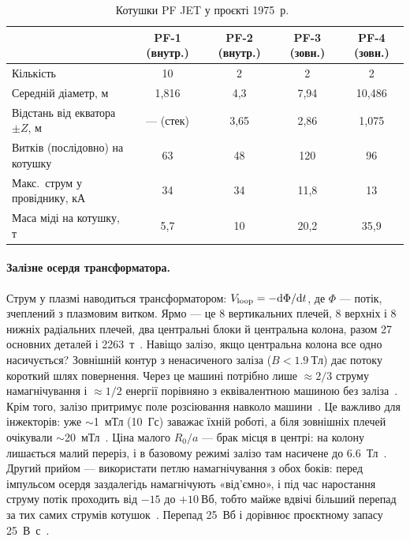 \begin{table}[!tb]\centering\small\setlength{\tabcolsep}{5pt}
\caption{Котушки PF JET у проєкті 1975~р.~\cite[с.~401]{JET1975}}\label{tab:04j-pf}
\begin{tabular}{@{}lcccc@{}}
\toprule
 & PF-1 (внутр.) & PF-2 (внутр.) & PF-3 (зовн.) & PF-4 (зовн.) \\
\midrule
Кількість & 10 & 2 & 2 & 2 \\
Середній діаметр, м & 1,816 & 4,3 & 7,94 & 10,486 \\
Відстань від екватора $\pm Z$, м & --- (стек) & 3,65 & 2,86 & 1,075 \\
Витків (послідовно) на котушку & 63 & 48 & 120 & 96 \\
Макс.\ струм у провіднику, кА & 34 & 34 & 11,8 & 13 \\
Маса міді на котушку, т & 5,7 & 10 & 20,2 & 35,9 \\
\bottomrule
\end{tabular}
\end{table}

\paragraph{Залізне осердя трансформатора.} Струм у плазмі наводиться трансформатором: $V_{\mathrm{loop}}=-\mathrm{d}\Phi/\mathrm{d} t$, де $\Phi$ --- потік, зчеплений з плазмовим витком. Ярмо --- це 8 вертикальних плечей, 8 верхніх і 8 нижніх радіальних плечей, два центральні блоки й центральна колона, разом 27 основних деталей і \SI{2263}{т}~\cite[с.~415]{JET1975}. Навіщо залізо, якщо центральна колона все одно насичується? Зовнішній контур з ненасиченого заліза ($B<\SI{1,9}{Тл}$) дає потоку короткий шлях повернення. Через це машині потрібно лише $\approx2/3$ струму намагнічування і $\approx1/2$ енергії порівняно з еквівалентною машиною без заліза~\cite[с.~399, 411]{JET1975}. Крім того, залізо притримує поле розсіювання навколо машини~\cite[с.~385]{JET1975}. Це важливо для інжекторів: уже $\sim$\SI{1}{мТл} (10~Гс) заважає їхній роботі, а біля зовнішніх плечей очікували $\sim$\SI{20}{мТл}~\cite[с.~419]{JET1975}. Ціна малого $R_0/a$ --- брак місця в центрі: на колону лишається малий переріз, і в базовому режимі залізо там насичене до \SI{6,6}{Тл}~\cite[с.~385, 412]{JET1975}. Другий прийом --- використати петлю намагнічування з обох боків: перед імпульсом осердя заздалегідь намагнічують «від'ємно», і під час наростання струму потік проходить від $-15$ до $+\SI{10}{Вб}$, тобто майже вдвічі більший перепад за тих самих струмів котушок~\cite[с.~411--412]{JET1975}. Перепад \SI{25}{Вб} і дорівнює проєктному запасу \SI{25}{В.с}~\cite[с.~83]{JET1975}.

